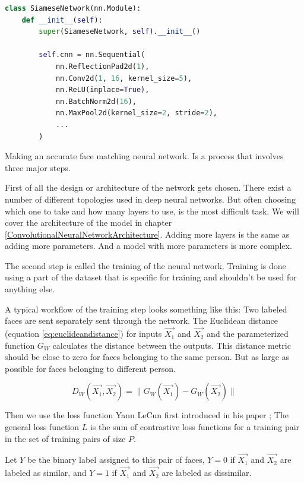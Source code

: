 \begin{lstlisting}[language=Python, caption={Pytorch neural network example}, label={lst:pytorch_example}, frame=single]
class SiameseNetwork(nn.Module):
    def __init__(self):
        super(SiameseNetwork, self).__init__()

        self.cnn = nn.Sequential(
            nn.ReflectionPad2d(1),
            nn.Conv2d(1, 16, kernel_size=5),
            nn.ReLU(inplace=True),
            nn.BatchNorm2d(16),
            nn.MaxPool2d(kernel_size=2, stride=2),
            ...
        )
\end{lstlisting}

Making an accurate face matching neural network. Is a process that involves three major steps.

First of all the design or architecture of the network gets chosen. There exist a number of different topologies used in deep neural networks. But often choosing which one to take and how many layers to use, is the most difficult task. We will cover the architecture of the model in chapter \ref{ConvolutionalNeuralNetworkArchitecture}. Adding more layers is the same as adding more parameters. And a model with more parameters is more complex.

The second step is called the training of the neural network. Training is done using a part of the dataset that is specific for training and shouldn't be used for anything else.

A typical workflow of the training step looks something like this: Two labeled faces are sent separately sent through the network. The Euclidean distance (equation \ref{eq:euclideandistance}) for inputs $\vec{X_{1}}$ and $\vec{X_{2}}$ and the parameterized function $G_{W}$ calculates the distance between the outputs. This distance metric should be close to zero for faces belonging to the same person. But as large as possible for faces belonging to different person.

\begin{equation} \label{eq:euclideandistance}
  D_{W}(\vec{X_{1}},\vec{X_{2}})=\lVert G_{W}(\vec{X_{1}}) - G_{W}(\vec{X_{2}}) \rVert
\end{equation}

Then we use the loss function Yann LeCun first introduced in his paper \cite{hadsell2006dimensionality}; The general loss function $L$ is the sum of contrastive loss functions for a training pair in the set of training pairs of size $P$.

Let $Y$ be the binary label assigned to this pair of faces, $Y=0$ if $\vec{X_{1}}$ and $\vec{X_{2}}$ are labeled as similar, and $Y=1$ if $\vec{X_{1}}$ and $\vec{X_{2}}$ are labeled as dissimilar.

